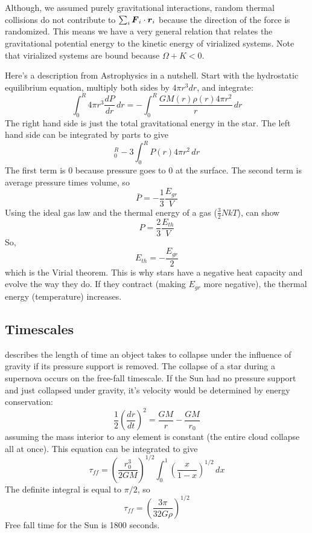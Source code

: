 Although, we assumed purely gravitational interactions, random thermal collisions
do not contribute to $\sum_i\boldsymbol F_i\cdot\boldsymbol r_i$ because the direction of the force is
randomized.  This means we have a very general relation that relates the gravitational potential
energy to the kinetic energy of virialized systems.  Note that virialized systems are
bound because $\Omega+K < 0$.

Here's a description from Astrophysics in a nutshell.  
Start with the hydrostatic equilibrium equation, multiply both sides by $4\pi r^3dr$, and integrate:
\begin{equation}
\int_0^R4\pi r^3\frac{dP}{dr}\,dr = -\int_0^R\frac{GM(r)\rho (r)4\pi r^2}{r}\,dr
\end{equation}
The right hand side is just the total gravitational energy in the star.  The left hand side 
can be integrated by parts to give
\begin{equation}
[P(r)4\pi r^3]_0^R-3\int_0^RP(r)4\pi r^2\,dr
\end{equation}
The first term is 0 because pressure goes to 0 at the surface.  The second term is average 
pressure times volume, so 
\begin{equation}
\bar{P}=-\frac{1}{3}\frac{E_{gr}}{V}
\end{equation}
Using the ideal gas law and the thermal energy of a gas ($\frac{3}{2}NkT$), can show
\begin{equation}
P=\frac{2}{3}\frac{E_{th}}{V}
\end{equation}
So, 
\begin{equation}
\boxed{E_{th}=-\frac{E_{gr}}{2}}
\end{equation}
which is the Virial theorem.  This is why stars have a negative heat capacity and evolve the way 
they do.  If they contract (making $E_{gr}$ more negative), the thermal energy (temperature) 
increases.


\subsection{Timescales}\label{sec:timescales}
 describes the length of time an object takes to collapse
under the influence of gravity if its pressure support is removed.  The collapse of a star
during a supernova occurs on the free-fall timescale.
If the Sun had no pressure support and just collapsed under gravity, it's velocity would be 
determined by energy conservation:
\begin{equation}
\frac{1}{2}\left(\frac{dr}{dt}\right)^2 = \frac{GM}{r}-\frac{GM}{r_0}
\end{equation}
assuming the mass interior to any element is constant (the entire cloud collapse all at once).
This equation can be integrated to give
\begin{equation}
\tau_{ff}=\left(\frac{r_0^3}{2GM}\right)^{1/2}\int_0^1\left(\frac{x}{1-x}\right)^{1/2}\,dx
\end{equation}
The definite integral is equal to $\pi/2$, so
\begin{equation}\boxed{
\tau_{ff}=\left(\frac{3\pi}{32G\rho}\right)^{1/2}
}\end{equation}
Free fall time for the Sun is 1800 seconds.

